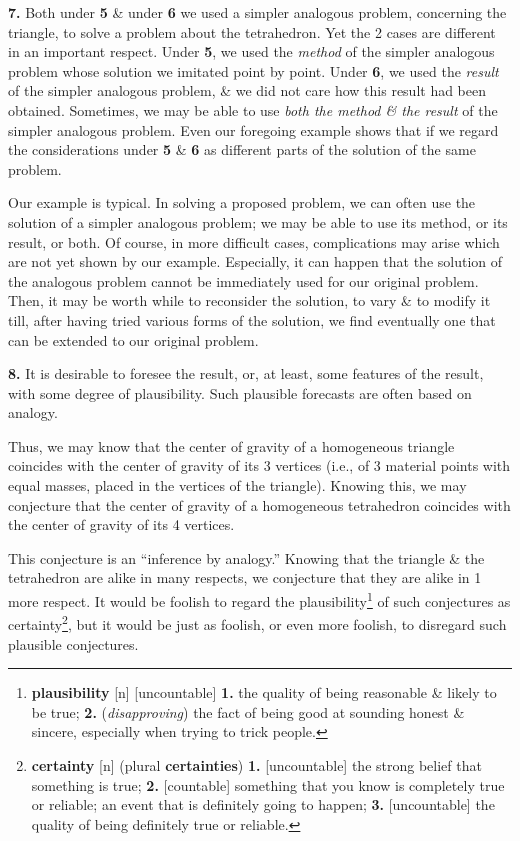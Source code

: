 \documentclass[oneside]{book}
\numberwithin{equation}{section}
\begin{document}
\textbf{7.} Both under \textbf{5} \& under \textbf{6} we used a simpler analogous problem, concerning the triangle, to solve a problem about the tetrahedron. Yet the 2 cases are different in an important respect. Under \textbf{5}, we used the \textit{method} of the simpler analogous problem whose solution we imitated point by point. Under \textbf{6}, we used the \textit{result} of the simpler analogous problem, \& we did not care how this result had been obtained. Sometimes, we may be able to use \textit{both the method \& the result} of the simpler analogous problem. Even our foregoing example shows that if we regard the considerations under \textbf{5} \& \textbf{6} as different parts of the solution of the same problem.

Our example is typical. In solving a proposed problem, we can often use the solution of a simpler analogous problem; we may be able to use its method, or its result, or both. Of course, in more difficult cases, complications may arise which are not yet shown by our example. Especially, it can happen that the solution of the analogous problem cannot be immediately used for our original problem. Then, it may be worth while to reconsider the solution, to vary \& to modify it till, after having tried various forms of the solution, we find eventually one that can be extended to our original problem.

\textbf{8.} It is desirable to foresee the result, or, at least, some features of the result, with some degree of plausibility. Such plausible forecasts are often based on analogy.

Thus, we may know that the center of gravity of a homogeneous triangle coincides with the center of gravity of its 3 vertices (i.e., of 3 material points with equal masses, placed in the vertices of the triangle). Knowing this, we may conjecture that the center of gravity of a homogeneous tetrahedron coincides with the center of gravity of its 4 vertices.

This conjecture is an ``inference by analogy.'' Knowing that the triangle \& the tetrahedron are alike in many respects, we conjecture that they are alike in 1 more respect. It would be foolish to regard the plausibility\footnote{\textbf{plausibility} [n] [uncountable] \textbf{1.} the quality of being reasonable \& likely to be true; \textbf{2.} (\textit{disapproving}) the fact of being good at sounding honest \& sincere, especially when trying to trick people.} of such conjectures as certainty\footnote{\textbf{certainty} [n] (plural \textbf{certainties}) \textbf{1.} [uncountable] the strong belief that something is true; \textbf{2.} [countable] something that you know is completely true or reliable; an event that is definitely going to happen; \textbf{3.} [uncountable] the quality of being definitely true or reliable.}, but it would be just as foolish, or even more foolish, to disregard such plausible conjectures.
\end{document}
